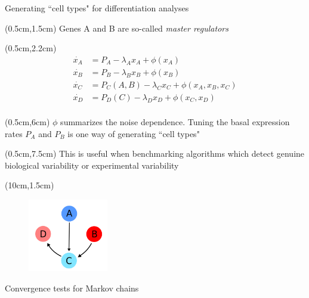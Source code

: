 \documentclass[aspectratio=1610]{beamer}					%
\begin{document}
\begin{frame}{Generating ``cell types" for differentiation analyses}

\begin{textblock*}{10cm}(0.5cm,1.5cm)
Genes A and B are so-called \emph{master regulators}
\end{textblock*}

\begin{textblock*}{10cm}(0.5cm,2.2cm)
\begin{align*}
\dot{x_{A}} &= P_{A} -\lambda_{A}x_{A} + \phi(x_{A})\\
\dot{x_{B}} &= P_{B} -\lambda_{B}x_{B} + \phi(x_{B})\\
\dot{x_{C}} &= P_{C}(A,B) -\lambda_{C}x_{C} + \phi(x_{A},x_{B},x_{C})\\
\dot{x_{D}} &= P_{D}(C) -\lambda_{D}x_{D} + \phi(x_{C},x_{D})\\
\end{align*}
\end{textblock*}

\begin{textblock*}{15cm}(0.5cm,6cm)
$\phi$ summarizes the noise dependence. Tuning the basal expression rates $P_{A}$ and $P_{B}$ is one way of generating ``cell types"
\end{textblock*}

\begin{textblock*}{15cm}(0.5cm,7.5cm)
This is useful when benchmarking algorithms which detect genuine biological variability or experimental variability
\end{textblock*}


\begin{textblock*}{3.5cm}(10cm,1.5cm)
\begin{figure}
\includegraphics[width=3.5cm]{master.png}
\end{figure}
\end{textblock*}

\end{frame}

\begin{frame}{Convergence tests for Markov chains}
\end{frame}
\end{document}
